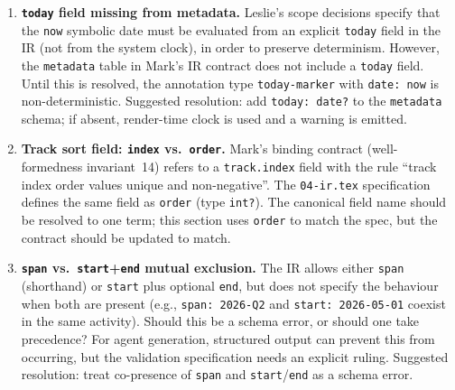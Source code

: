 \begin{enumerate}
  \item \textbf{\texttt{today} field missing from metadata.} Leslie's scope decisions
        specify that the \texttt{now} symbolic date must be evaluated from an explicit
        \texttt{today} field in the IR (not from the system clock), in order to preserve
        determinism. However, the \texttt{metadata} table in Mark's IR contract does not
        include a \texttt{today} field. Until this is resolved, the annotation type
        \texttt{today-marker} with \texttt{date: now} is non-deterministic. Suggested
        resolution: add \texttt{today: date?} to the \texttt{metadata} schema; if absent,
        render-time clock is used and a warning is emitted.

  \item \textbf{Track sort field: \texttt{index} vs.\ \texttt{order}.} Mark's binding
        contract (well-formedness invariant~14) refers to a \texttt{track.index} field
        with the rule ``track index order values unique and non-negative''. The
        \texttt{04-ir.tex} specification defines the same field as \texttt{order}
        (type \texttt{int?}). The canonical field name should be resolved to one term;
        this section uses \texttt{order} to match the spec, but the contract should
        be updated to match.

  \item \textbf{\texttt{span} vs.\ \texttt{start}+\texttt{end} mutual exclusion.}
        The IR allows either \texttt{span} (shorthand) or \texttt{start} plus optional
        \texttt{end}, but does not specify the behaviour when both are present (e.g.,
        \texttt{span: 2026-Q2} and \texttt{start: 2026-05-01} coexist in the same
        activity). Should this be a schema error, or should one take precedence?
        For agent generation, structured output can prevent this from occurring, but the
        validation specification needs an explicit ruling. Suggested resolution: treat
        co-presence of \texttt{span} and \texttt{start}/\texttt{end} as a schema error.
\end{enumerate}
